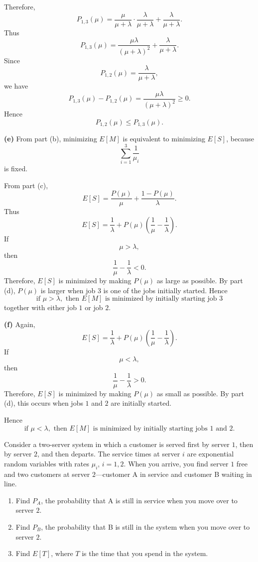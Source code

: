 {Therefore,
\[
P_{1,3}(\mu)
=
\frac{\mu}{\mu+\lambda}\cdot \frac{\lambda}{\mu+\lambda}
+
\frac{\lambda}{\mu+\lambda}.
\]
Thus
\[
P_{1,3}(\mu)
=
\frac{\mu\lambda}{(\mu+\lambda)^2}
+
\frac{\lambda}{\mu+\lambda}.
\]
Since
\[
P_{1,2}(\mu)=\frac{\lambda}{\mu+\lambda},
\]
we have
\[
P_{1,3}(\mu)-P_{1,2}(\mu)
=
\frac{\mu\lambda}{(\mu+\lambda)^2}\ge 0.
\]
Hence
\[
{
P_{1,2}(\mu)\le P_{1,3}(\mu).
}
\]

\textbf{(e)}
From part (b), minimizing $E[M]$ is equivalent to minimizing $E[S]$, because
\[
\sum_{i=1}^3\frac1{\mu_i}
\]
is fixed.

From part (c),
\[
E[S]=\frac{P(\mu)}{\mu}+\frac{1-P(\mu)}{\lambda}.
\]
Thus
\[
E[S]
=
\frac1\lambda
+
P(\mu)\left(\frac1\mu-\frac1\lambda\right).
\]
If
\[
\mu>\lambda,
\]
then
\[
\frac1\mu-\frac1\lambda<0.
\]
Therefore, $E[S]$ is minimized by making $P(\mu)$ as large as possible. By part (d), $P(\mu)$ is larger when job $3$ is one of the jobs initially started. Hence
\[
{
\text{if }\mu>\lambda,\text{ then }E[M]\text{ is minimized by initially starting job }3
}
\]
together with either job $1$ or job $2$.

\textbf{(f)}
Again,
\[
E[S]
=
\frac1\lambda
+
P(\mu)\left(\frac1\mu-\frac1\lambda\right).
\]
If
\[
\mu<\lambda,
\]
then
\[
\frac1\mu-\frac1\lambda>0.
\]
Therefore, $E[S]$ is minimized by making $P(\mu)$ as small as possible. By part (d), this occurs when jobs $1$ and $2$ are initially started.

Hence
\[
{
\text{if }\mu<\lambda,\text{ then }E[M]\text{ is minimized by initially starting jobs }1\text{ and }2.
}
\]
}

\setcounter{exercise}{19}
\begin{exercise}
\label{ex:counting-processes-20}
Consider a two-server system in which a customer is served first by server $1$, then by server $2$, and then departs. The service times at server $i$ are exponential random variables with rates $\mu_i$, $i=1,2$. When you arrive, you find server $1$ free and two customers at server $2$---customer A in service and customer B waiting in line.
\begin{enumerate}
\item Find $P_A$, the probability that A is still in service when you move over to server $2$.
\item Find $P_B$, the probability that B is still in the system when you move over to server $2$.
\item Find $E[T]$, where $T$ is the time that you spend in the system.
\end{enumerate}
\end{exercise}

